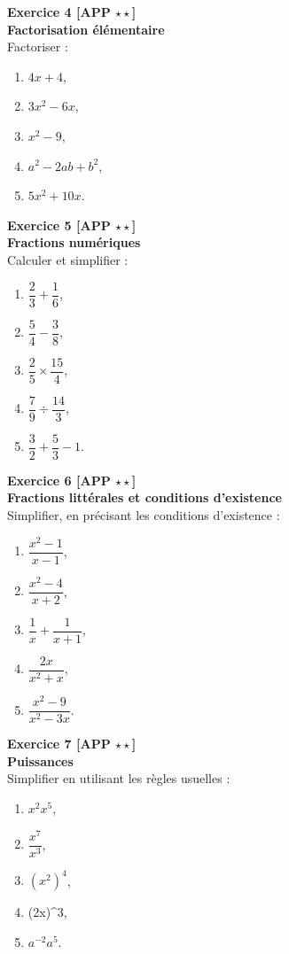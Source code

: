 \documentclass[11pt,a4paper]{article}
\begin{document}
\textbf{Exercice 4 [APP $\star\star$]}\\
\textbf{Factorisation élémentaire}\\
Factoriser :
\begin{enumerate}[label=\alph*)]
    \item $4x+4$,
    \item $3x^2-6x$,
    \item $x^2-9$,
    \item $a^2-2ab+b^2$,
    \item $5x^2+10x$.
\end{enumerate}

\textbf{Exercice 5 [APP $\star\star$]}\\
\textbf{Fractions numériques}\\
Calculer et simplifier :
\begin{enumerate}[label=\alph*)]
    \item $\dfrac{2}{3}+\dfrac{1}{6}$,
    \item $\dfrac{5}{4}-\dfrac{3}{8}$,
    \item $\dfrac{2}{5}\times\dfrac{15}{4}$,
    \item $\dfrac{7}{9}\div\dfrac{14}{3}$,
    \item $\dfrac{3}{2}+\dfrac{5}{3}-1$.
\end{enumerate}

\textbf{Exercice 6 [APP $\star\star$]}\\
\textbf{Fractions littérales et conditions d’existence}\\
Simplifier, en précisant les conditions d’existence :
\begin{enumerate}[label=\alph*)]
    \item $\dfrac{x^2-1}{x-1}$,
    \item $\dfrac{x^2-4}{x+2}$,
    \item $\dfrac{1}{x}+\dfrac{1}{x+1}$,
    \item $\dfrac{2x}{x^2+x}$,
    \item $\dfrac{x^2-9}{x^2-3x}$.
\end{enumerate}

\textbf{Exercice 7 [APP $\star\star$]}\\
\textbf{Puissances}\\
Simplifier en utilisant les règles usuelles :
\begin{enumerate}[label=\alph*)]
    \item $x^2x^5$,
    \item $\dfrac{x^7}{x^3}$,
    \item $(x^2)^4$,
    \item (2x)^3,
    \item $a^{-2}a^5$.
\end{enumerate}
\end{document}
